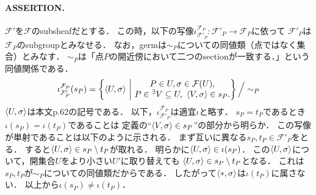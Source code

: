 \documentclass[a4paper]{jsarticle}
\newcommand{\shF}{\mathcal{F}}
\begin{document}
    \paragraph{ASSERTION.}
    $\shF'$を$\shF$のsubsheafだとする．
    この時，以下の写像$\iota_{\shF'_P}^{\shF_P}: \shF'_P \to \shF_P$に依って
    $\shF'_P$は$\shF_P$のsubgroupとみなせる．
    なお，germは$\sim_P$についての同値類（点ではなく集合）とみなす．
    $\sim_P$は「点$P$の開近傍において二つのsectionが一致する．」という同値関係である．
    \[
    \iota_{\shF'_P}^{\shF_P}(s_P)=
        \left\{ \germ{U}{\sigma} ~\middle|~ 
            \begin{array}{@{}c@{}}
                P \in U, \sigma \in \shF(U), \\ 
                P \in {}^{\exists}{V} \subseteq U,~ \germ{V}{\sigma} \in s_P.
            \end{array}
        \right\}
        \Big/ \sim_P
    \]
    $\langle U,\sigma \rangle$は本文p.62の記号である．
    以下，$\iota_{\shF'_P}^{\shF_P}$は適宜$\iota$と略す．
    $s_P=t_P$であるとき$\iota(s_P)=\iota(t_P)$であることは
    定義の``$\langle V,\sigma \rangle \in s_P$''の部分から明らか．
    この写像が単射であることは以下のように示される．
    まず互いに異なる$s_P, t_P \in \shF'_P$をとる．
    すると$\langle U,\sigma \rangle \in s_P \setminus t_P$が取れる．
    明らかに$\langle U,\sigma \rangle \in \iota(s_P)$．
    この$\langle U,\sigma \rangle$について，開集合$U$をより小さい$U'$に取り替えても
    $\langle U,\sigma \rangle \in s_P \setminus t_P$となる．
    これは$s_P, t_P$が$\sim_P$についての同値類だからである．
    したがって$\langle *,\sigma \rangle$は$\iota(t_P)$に属さない．
    以上から$\iota(s_P) \neq \iota(t_P)$．
\end{document}
